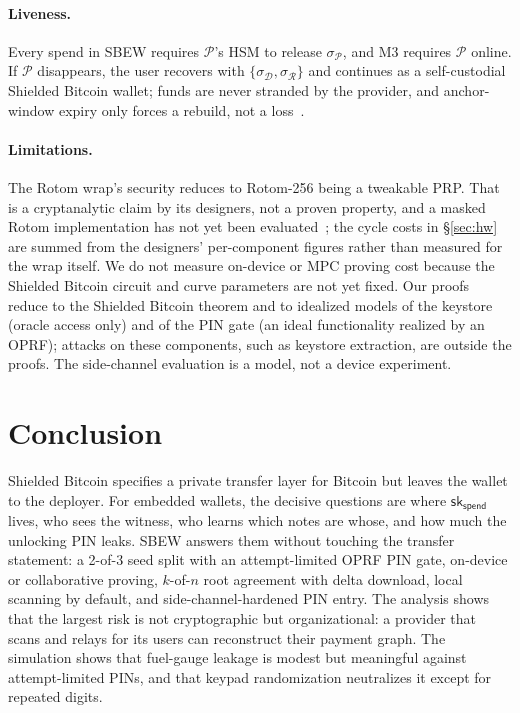 \documentclass[11pt]{article}
\theoremstyle{remark}
\newcommand{\sk}{\mathsf{sk}}
\newcommand{\SB}{Shielded Bitcoin}
\newcommand{\sysname}{\textsf{SBEW}}
\begin{document}
\paragraph{Liveness.} Every spend in \sysname{} requires $\mathcal{P}$'s HSM to release $\sigma_{\mathcal{P}}$, and M3 requires $\mathcal{P}$ online. If $\mathcal{P}$ disappears, the user recovers with $\{\sigma_{\mathcal{D}}, \sigma_{\mathcal{R}}\}$ and continues as a self-custodial \SB{} wallet; funds are never stranded by the provider, and anchor-window expiry only forces a rebuild, not a loss~\cite[§13]{sb26}.

\paragraph{Limitations.} The Rotom wrap's security reduces to Rotom-256 being a tweakable PRP. That is a cryptanalytic claim by its designers, not a proven property, and a masked Rotom implementation has not yet been evaluated~\cite[§5.4.2]{rotom26}; the cycle costs in §\ref{sec:hw} are summed from the designers' per-component figures rather than measured for the wrap itself. We do not measure on-device or MPC proving cost because the \SB{} circuit and curve parameters are not yet fixed. Our proofs reduce to the \SB{} theorem and to idealized models of the keystore (oracle access only) and of the PIN gate (an ideal functionality realized by an OPRF); attacks on these components, such as keystore extraction, are outside the proofs. The side-channel evaluation is a model, not a device experiment.

\section{Conclusion}
\SB{} specifies a private transfer layer for Bitcoin but leaves the wallet to the deployer. For embedded wallets, the decisive questions are where $\sk_{\mathsf{spend}}$ lives, who sees the witness, who learns which notes are whose, and how much the unlocking PIN leaks. \sysname{} answers them without touching the transfer statement: a 2-of-3 seed split with an attempt-limited OPRF PIN gate, on-device or collaborative proving, $k$-of-$n$ root agreement with delta download, local scanning by default, and side-channel-hardened PIN entry. The analysis shows that the largest risk is not cryptographic but organizational: a provider that scans and relays for its users can reconstruct their payment graph. The simulation shows that fuel-gauge leakage is modest but meaningful against attempt-limited PINs, and that keypad randomization neutralizes it except for repeated digits.
\end{document}
